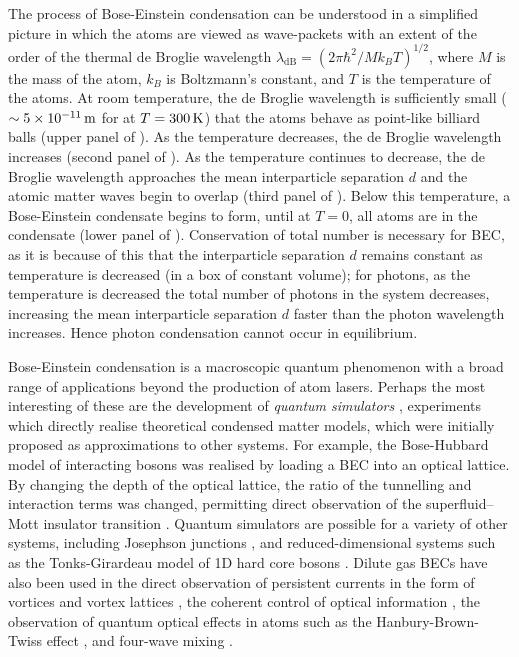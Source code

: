 The process of Bose-Einstein condensation can be understood in a simplified picture in which the atoms are viewed as wave-packets with an extent of the order of the thermal de Broglie wavelength $\lambda_\text{dB} = (2 \pi \hbar^2 / M k_B T)^{1/2}$, where $M$ is the mass of the atom, $k_B$ is Boltzmann's constant, and $T$ is the temperature of the atoms.  At room temperature, the de Broglie wavelength is sufficiently small ($\sim 5\times\unit[10^{-11}]{m}$ for  at $T=\unit[300]{K}$) that the atoms behave as point-like billiard balls (upper panel of ).  As the temperature decreases, the de Broglie wavelength increases (second panel of ).  As the temperature continues to decrease, the de Broglie wavelength approaches the mean interparticle separation $d$ and the atomic matter waves begin to overlap (third panel of ).  Below this temperature, a Bose-Einstein condensate begins to form, until at $T=0$, all atoms are in the condensate (lower panel of ).  Conservation of total number is necessary for BEC, as it is because of this that the interparticle separation $d$ remains constant as temperature is decreased (in a box of constant volume); for photons, as the temperature is decreased the total number of photons in the system decreases, increasing the mean interparticle separation $d$ faster than the photon wavelength increases.  Hence photon condensation cannot occur in equilibrium.

Bose-Einstein condensation is a macroscopic quantum phenomenon with a broad range of applications beyond the production of atom lasers.  Perhaps the most interesting of these are the development of \emph{quantum simulators} \citep{Lewenstein:2007,Buluta:2009}, experiments which directly realise theoretical condensed matter models, which were initially proposed as approximations to other systems.  For example, the Bose-Hubbard model \citep{Fisher:1989} of interacting bosons was realised by loading a BEC into an optical lattice.  By changing the depth of the optical lattice, the ratio of the tunnelling and interaction terms was changed, permitting direct observation of the superfluid--Mott insulator transition \citep{Greiner:2002lr}.  Quantum simulators are possible for a variety of other systems, including Josephson junctions \citep{Levy:2007vn}, and reduced-dimensional systems such as the Tonks-Girardeau model of 1D hard core bosons \citep{Girardeau:1960,Lieb:1963,Paredes:2004}.  Dilute gas BECs have also been used in the direct observation of persistent currents in the form of vortices and vortex lattices \citep{Abo-Shaeer:2001}, the coherent control of optical information \citep{Ginsberg:2007fk}, the observation of quantum optical effects in atoms such as the Hanbury-Brown-Twiss effect \citep{Jeltes:2007fk}, and four-wave mixing \citep{Deng:1999qy}.

